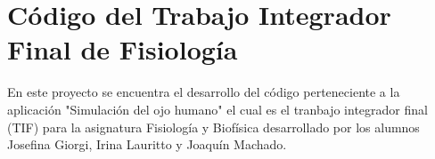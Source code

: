 \chapter{Código del Trabajo Integrador Final de Fisiología}
\hypertarget{md__c_1_2_repositorio_t_i_f_2_software_2_trabajo_integrador_final___fisio_2_r_e_a_d_m_e}{}\label{md__c_1_2_repositorio_t_i_f_2_software_2_trabajo_integrador_final___fisio_2_r_e_a_d_m_e}
\label{md__c_1_2_repositorio_t_i_f_2_software_2_trabajo_integrador_final___fisio_2_r_e_a_d_m_e_autotoc_md8}%
%
En este proyecto se encuentra el desarrollo del código perteneciente a la aplicación "{}\+Simulación del ojo humano"{} el cual es el tranbajo integrador final (TIF) para la asignatura Fisiología y Biofísica desarrollado por los alumnos Josefina Giorgi, Irina Lauritto y Joaquín Machado. 